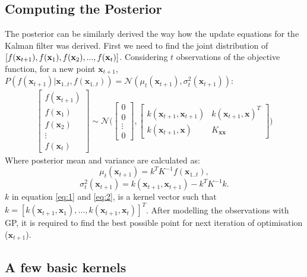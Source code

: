 \subsection{Computing the Posterior}
The posterior can be similarly derived the way how the update equations for the Kalman filter was derived. First we need to find the joint distribution of $[f(\textbf{x}_{t+1}),f(\textbf{x}_1),\\ f(\textbf{x}_2),...,f(\textbf{x}_t)]$.
Considering $t$  observations of the objective function, for a new point $\textbf{x}_{t+1}$, $P(f(\textbf{x}_{t+1})|\textbf{x}_{1..t},f(\textbf{x}_{1..t})) = \mathcal{N}(\mu_t(\textbf{x}_{t+1}),\sigma^2_t(\textbf{x}_{t+1}))$:
\begin{align}
   \begin{bmatrix} 
    f(\textbf{x}_{t+1})\\
    f(\textbf{x}_{1})\\
    f(\textbf{x}_{2})\\
    \vdots\\
    f(\textbf{x}_{t})
    \end{bmatrix} \sim \mathcal{N} \Bigg(    
   \begin{bmatrix} 
    0\\
    0\\
    \vdots\\
    0
 	\end{bmatrix},\begin{bmatrix} 
    k(\textbf{x}_{t+1},\textbf{x}_{t+1}) & k(\textbf{x}_{t+1},\textbf{x})^T\\
    k(\textbf{x}_{t+1},\textbf{x}) & K_{\textbf{xx}}
    \end{bmatrix}\Bigg)
\end{align}
Where posterior mean and variance are calculated as:
\begin{equation}
\mu_t(\textbf{x}_{t+1}) = k^T  K^{-1}  f(\textbf{x}_{1..t}), 
\label{eq:1}
\end{equation}
\begin{equation}
\sigma^2_t(\textbf{x}_{t+1}) = k(\textbf{x}_{t+1},\textbf{x}_{t+1}) - k^T K^{-1} k.
\label{eq:2}
\end{equation}
$k$ in equation \ref{eq:1} and \ref{eq:2}, is a kernel vector such that $k = [k(\textbf{x}_{t+1},\textbf{x}_1),...,k(\textbf{x}_{t+1},\textbf{x}_t)]^T$.
After modelling the observations with GP, it is required to find the best possible point for next iteration of optimisation ($\textbf{x}_{t+1}$).

\subsection{A few basic kernels}

